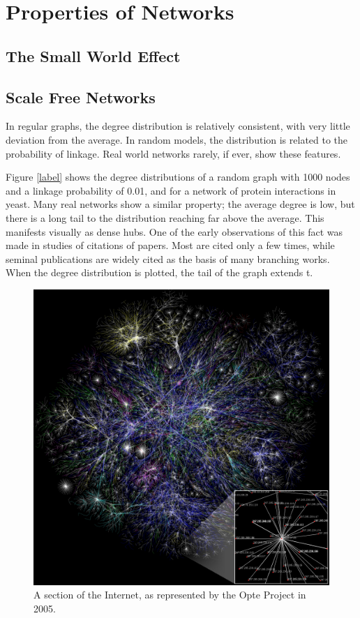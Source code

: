 \section{Properties of Networks}


\subsection{The Small World Effect}


\subsection{Scale Free Networks}

In regular graphs, the degree distribution is relatively consistent, with very little deviation from the average. In random models, the distribution is related to the probability of linkage. Real world networks rarely, if ever, show these features.


Figure \ref{label} shows the degree distributions of a random graph with 1000 nodes and a linkage probability of 0.01, and for a network of protein interactions in yeast. Many real networks show a similar property; the average degree is low, but there is a long tail to the distribution reaching far above the average. This manifests visually as dense hubs. One of the early observations of this fact was made in studies of citations of papers. Most are cited only a few times, while seminal publications are widely cited as the basis of many branching works. When the degree distribution is plotted, the tail of the graph extends t.

\begin{figure}[!h]
	\begin{center}
		\includegraphics[scale=0.15]{images/Internet_map_1024.jpg}
	\end{center}
	\caption{A section of the Internet, as represented by the Opte Project in 2005.}
	\label{logo}
\end{figure}


